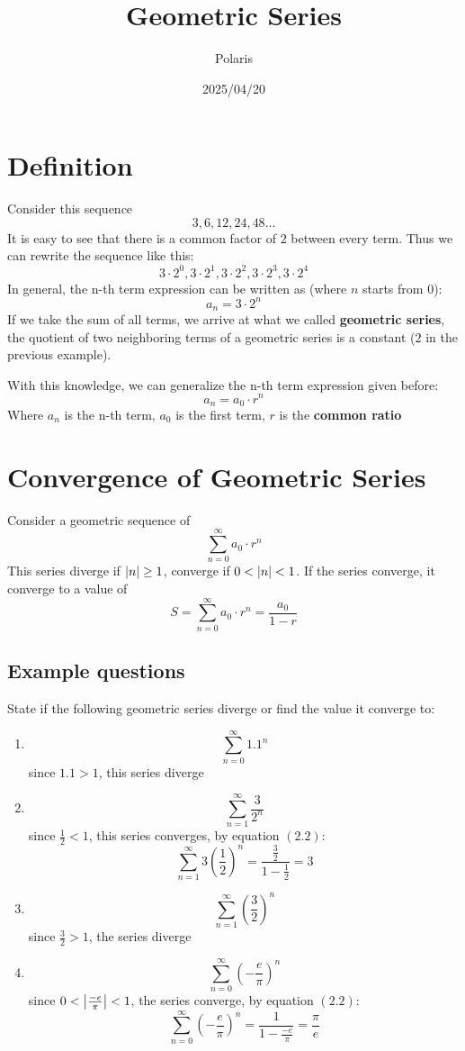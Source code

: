 \documentclass{article}
\title{Geometric Series}
\author{Polaris}
\date{2025/04/20}
\numberwithin{equation}{section}
\begin{document}
\maketitle

\section{Definition}
Consider this sequence
\[
\text{{$3,6,12,24,48$...}}
\]
It is easy to see that there is a common factor of $2$ between every term.
Thus we can rewrite the sequence like this:
\[
\text{{$3\cdot 2^0, 3\cdot 2^1, 3\cdot 2^2, 3\cdot 2^3, 3\cdot 2^4$}}
\]
In general, the n-th term expression can be written as (where $n$ starts from 0):
\[
a_n = 3\cdot 2^n
\]
If we take the sum of all terms, we arrive at what we called \textbf{geometric series},
the quotient of two neighboring terms of a geometric series is a constant ($2$ in the previous example).

With this knowledge, we can generalize the n-th term expression given before:
\[
a_n = a_0 \cdot r^n
\]
Where $a_n$ is the n-th term, $a_0$ is the first term, $r$ is the \textbf{common ratio}

\section{Convergence of Geometric Series}
Consider a geometric sequence of
\[
\sum_{n=0}^{\infty} a_0 \cdot r^n
\]
This series diverge if $\abs{n} \geq 1$, converge if $0 < \abs{n} < 1$. If the series converge, it converge
to a value of 
\[
S = \sum_{n=0}^{\infty} a_0 \cdot r^n = \frac{a_0}{1-r}
\]

\subsection{Example questions}
State if the following geometric series diverge or find the value it converge to:
\begin{enumerate}
    \item \[\sum_{n = 0}^\infty 1.1^n \]
    since $1.1 > 1$, this series diverge

    \item \[\sum_{n = 1}^\infty \frac{3}{2^n} \]
    since $\frac{1}{2} < 1$, this series converges, by equation $(2.2)$:
    \[
    \sum_{n = 1}^{\infty} 3(\frac{1}{2})^n = \frac{\frac{3}{2}}{1-\frac{1}{2}} = 3
    \]

    \item \[\sum_{n = 1}^{\infty} \left(\frac{3}{2} \right)^n \]
    since $\frac{3}{2} > 1$, the series diverge

    \item  \[\sum_{n = 0}^{\infty} \left( -\frac{e}{\pi}\right)^n\]
    since $0 < \abs{\frac{-e}{\pi}} < 1$, the series converge, by equation $(2.2)$:
    \[
        \sum_{n = 0}^{\infty} \left( -\frac{e}{\pi}\right)^n = \frac{1}{1 - \frac{-e}{\pi}} = \frac{\pi}{e}
    \]
\end{enumerate}
\end{document}
